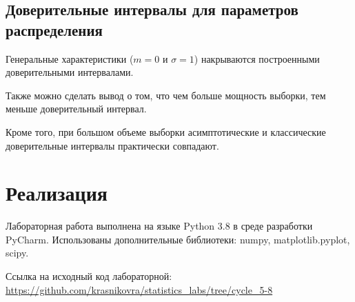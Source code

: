 \documentclass[12pt]{article}
\begin{document}
	\subsection{Доверительные интервалы для параметров распределения}
	
	Генеральные характеристики ($m = 0$ и $\sigma = 1$) накрываются построенными доверительными интервалами.
	
	Также можно сделать вывод о том, что чем больше мощность выборки, тем меньше доверительный интервал.
	
	Кроме того, при большом объеме выборки асимптотические и классические доверительные интервалы практически совпадают.
	
	\section{Реализация}
	
	Лабораторная работа выполнена на языке Python 3.8 в среде разработки PyCharm. Использованы дополнительные библиотеки: numpy, matplotlib.pyplot, scipy.
	
	Ссылка на исходный код лабораторной: \url{https://github.com/krasnikovra/statistics_labs/tree/cycle_5-8}
	
\end{document}
